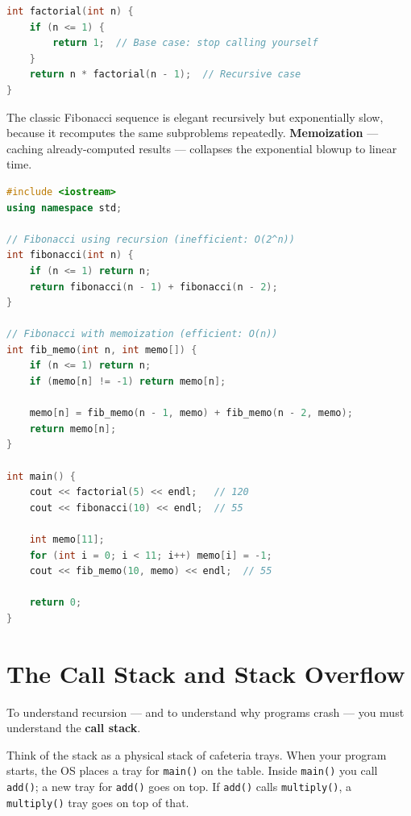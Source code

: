 \begin{lstlisting}[language=C++, caption={Factorial via recursion}]
int factorial(int n) {
    if (n <= 1) {
        return 1;  // Base case: stop calling yourself
    }
    return n * factorial(n - 1);  // Recursive case
}
\end{lstlisting}

The classic Fibonacci sequence is elegant recursively but exponentially slow, because it recomputes the same subproblems repeatedly. \textbf{Memoization} --- caching already-computed results --- collapses the exponential blowup to linear time.

\begin{lstlisting}[language=C++, caption={Naive vs. memoized recursion}]
#include <iostream>
using namespace std;

// Fibonacci using recursion (inefficient: O(2^n))
int fibonacci(int n) {
    if (n <= 1) return n;
    return fibonacci(n - 1) + fibonacci(n - 2);
}

// Fibonacci with memoization (efficient: O(n))
int fib_memo(int n, int memo[]) {
    if (n <= 1) return n;
    if (memo[n] != -1) return memo[n];

    memo[n] = fib_memo(n - 1, memo) + fib_memo(n - 2, memo);
    return memo[n];
}

int main() {
    cout << factorial(5) << endl;   // 120
    cout << fibonacci(10) << endl;  // 55

    int memo[11];
    for (int i = 0; i < 11; i++) memo[i] = -1;
    cout << fib_memo(10, memo) << endl;  // 55

    return 0;
}
\end{lstlisting}

\section{The Call Stack and Stack Overflow}
\label{sec:call-stack}

To understand recursion --- and to understand why programs crash --- you must understand the \textbf{call stack}.

Think of the stack as a physical stack of cafeteria trays. When your program starts, the OS places a tray for \texttt{main()} on the table. Inside \texttt{main()} you call \texttt{add()}; a new tray for \texttt{add()} goes on top. If \texttt{add()} calls \texttt{multiply()}, a \texttt{multiply()} tray goes on top of that.

